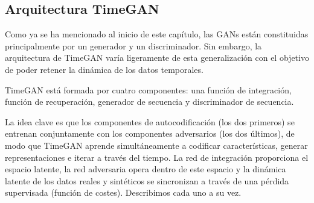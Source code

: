 \subsection{Arquitectura TimeGAN}

Como ya se ha mencionado al inicio de este capítulo, las GANs están constituidas principalmente por un generador y un discriminador. Sin embargo, la arquitectura de TimeGAN varía ligeramente de esta generalización con el objetivo de poder retener la dinámica de los datos temporales.

TimeGAN está formada por cuatro componentes: una función de integración, función de recuperación, generador de secuencia y discriminador de secuencia. 

La idea clave es que los componentes de autocodificación (los dos primeros) se entrenan conjuntamente con los componentes adversarios (los dos últimos), de modo que TimeGAN aprende simultáneamente a codificar características, generar representaciones e iterar a través del tiempo. La red de integración proporciona el espacio latente, la red adversaria opera dentro de este espacio y la dinámica latente de los datos reales y sintéticos se sincronizan a través de una pérdida supervisada (función de costes). Describimos cada uno a su vez.

